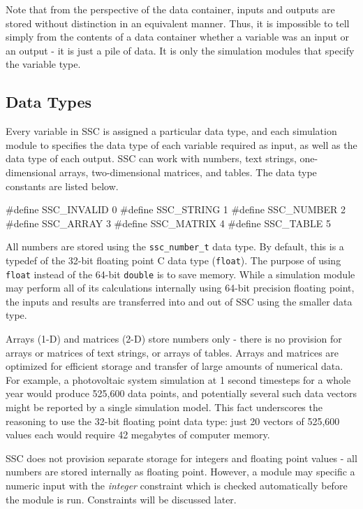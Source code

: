 \documentclass{article}
\begin{document}
Note that from the perspective of the data container, inputs and outputs are stored without distinction in an equivalent manner.  Thus, it is impossible to tell simply from the contents of a data container whether a variable was an input or an output - it is just a pile of data.  It is only the simulation modules that specify the variable type.

\subsection{Data Types}

Every variable in SSC is assigned a particular data type, and each simulation module to specifies the data type of each variable required as input, as well as the data type of each output.  SSC can work with numbers, text strings, one-dimensional arrays, two-dimensional matrices, and tables.  The data type constants are listed below.

\begin{verbatimtab}
#define SSC_INVALID 0
#define SSC_STRING 1
#define SSC_NUMBER 2
#define SSC_ARRAY 3
#define SSC_MATRIX 4
#define SSC_TABLE 5
\end{verbatimtab}

All numbers are stored using the \texttt{ssc\_number\_t} data type.  By default, this is a typedef of the 32-bit floating point C data type (\texttt{float}).  The purpose of using \texttt{float} instead of the 64-bit \texttt{double} is to save memory.  While a simulation module may perform all of its calculations internally using 64-bit precision floating point, the inputs and results are transferred into and out of SSC using the smaller data type.

Arrays (1-D) and matrices (2-D) store numbers only - there is no provision for arrays or matrices of text strings, or arrays of tables.  Arrays and matrices are optimized for efficient storage and transfer of large amounts of numerical data.  For example, a photovoltaic system simulation at 1 second timesteps for a whole year would produce 525,600 data points, and potentially several such data vectors might be reported by a single simulation model.  This fact underscores the reasoning to use the 32-bit floating point data type: just 20 vectors of 525,600 values each would require 42 megabytes of computer memory.

SSC does not provision separate storage for integers and floating point values - all numbers are stored internally as floating point.  However, a module may specific a numeric input with the \emph{integer} constraint which is checked automatically before the module is run.  Constraints will be discussed later.
\end{document}

